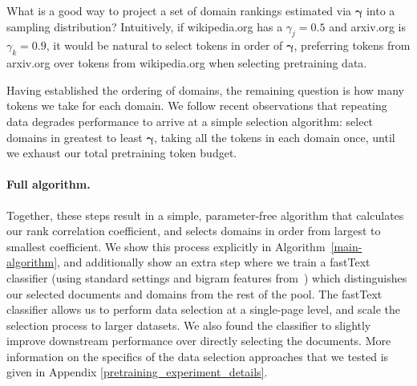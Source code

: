 \documentclass{article} %
\begin{document}
What is a good way to project a set of domain rankings estimated via $\bm{\gamma}$ into a sampling distribution? Intuitively, if wikipedia.org has a $\gamma_j =0.5$ and arxiv.org is $\gamma_k = 0.9$, it would be natural to select tokens in order of $\bm{\gamma}$, preferring tokens from arxiv.org over tokens from wikipedia.org when selecting pretraining data.

Having established the ordering of domains, the remaining question is how many tokens we take for each domain. We follow recent observations that repeating data degrades performance \citep{semdedup} to arrive at a simple selection algorithm: select domains in greatest to least $\bm{\gamma}$, taking all the tokens in each domain once, until we exhaust our total pretraining token budget.

\paragraph*{Full algorithm.} Together, these steps result in a simple, parameter-free algorithm that calculates our rank correlation coefficient, and selects domains in order from largest to smallest coefficient. We show this process explicitly in Algorithm~\ref{main-algorithm}, and additionally show an extra step where we train a fastText \citep{fasttext} classifier (using standard settings and bigram features from~\citet{datacomp}) which distinguishes our selected documents and domains from the rest of the pool. The fastText classifier allows us to perform data selection at a single-page level, and scale the selection process to larger datasets. We also found the classifier to slightly improve downstream performance over directly selecting the documents. More information on the specifics of the data selection approaches that we tested is given in Appendix \ref{pretraining_experiment_details}.
\end{document}
